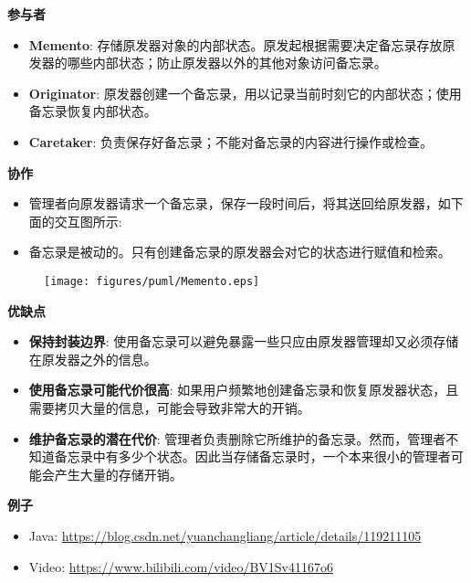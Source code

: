 \noindent\textbf{参与者}

\begin{itemize}
    \item \textbf{Memento}: 存储原发器对象的内部状态。原发起根据需要决定备忘录存放原发器的哪些内部状态；防止原发器以外的其他对象访问备忘录。
    \item \textbf{Originator}: 原发器创建一个备忘录，用以记录当前时刻它的内部状态；使用备忘录恢复内部状态。
    \item \textbf{Caretaker}: 负责保存好备忘录；不能对备忘录的内容进行操作或检查。
\end{itemize}

\noindent\textbf{协作}

\begin{itemize}
    \item 管理者向原发器请求一个备忘录，保存一段时间后，将其送回给原发器，如下面的交互图所示:
    \item 备忘录是被动的。只有创建备忘录的原发器会对它的状态进行赋值和检索。
\end{itemize}

\begin{figure}[H] 
    \centering 
    \texttt{[image: figures/puml/Memento.eps]} 
\end{figure}

\noindent\textbf{优缺点}

\begin{itemize}
    \item \textbf{保持封装边界}: 使用备忘录可以避免暴露一些只应由原发器管理却又必须存储在原发器之外的信息。
    \item \textbf{使用备忘录可能代价很高}: 如果用户频繁地创建备忘录和恢复原发器状态，且需要拷贝大量的信息，可能会导致非常大的开销。
    \item \textbf{维护备忘录的潜在代价}: 管理者负责删除它所维护的备忘录。然而，管理者不知道备忘录中有多少个状态。因此当存储备忘录时，一个本来很小的管理者可能会产生大量的存储开销。
\end{itemize}

\noindent\textbf{例子}

\begin{itemize}
    \item Java: \url{https://blog.csdn.net/yuanchangliang/article/details/119211105}
    \item Video: \url{https://www.bilibili.com/video/BV1Sv41167o6}
\end{itemize}



\newpage